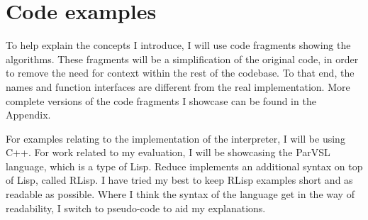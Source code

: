 \section{Code examples}

To help explain the concepts I introduce, I will use code fragments showing the algorithms.
These fragments will be a simplification of the original code, in order to remove the need
for context within the rest of the codebase. To that end, the names and function interfaces
are different from the real implementation. More complete versions of the code fragments
I showcase can be found in the Appendix.

For examples relating to the implementation of the interpreter, I will be using C++.
For work related to my evaluation, I will be showcasing the ParVSL language, which is a type
of Lisp. Reduce implements an additional syntax on top of Lisp, called RLisp.
I have tried my best to keep RLisp examples short and as readable
as possible. Where I think the syntax of the language get in the way of readability, I
switch to pseudo-code to aid my explanations.
